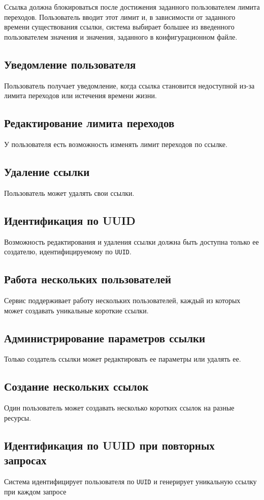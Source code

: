 \documentclass[a4paper, 14pt]{article}
\begin{document}
Ссылка должна блокироваться после достижения заданного пользователем лимита переходов. Пользователь вводит этот лимит и, в зависимости от заданного времени существования ссылки, система выбирает большее из введенного пользователем значения и значения, заданного в конфигурационном файле.

\subsection{Уведомление пользователя}

Пользователь получает уведомление, когда ссылка становится недоступной из-за лимита переходов или истечения времени жизни.

\subsection{Редактирование лимита переходов}

У пользователя есть возможность изменять лимит переходов по ссылке.

\subsection{Удаление ссылки}

Пользователь может удалять свои ссылки.

\subsection{Идентификация по UUID}

Возможность редактирования и удаления ссылки должна быть доступна только ее создателю, идентифицируемому по \texttt{UUID}.

\subsection{Работа нескольких пользователей}

Сервис поддерживает работу нескольких пользователей, каждый из которых может создавать уникальные короткие ссылки.

\subsection{Администрирование параметров ссылки}

Только создатель ссылки может редактировать ее параметры или удалять ее.

\subsection{Создание нескольких ссылок}

Один пользователь может создавать несколько коротких ссылок на разные ресурсы.

\subsection{Идентификация по UUID при повторных запросах}

Система идентифицирует пользователя по \texttt{UUID} и генерирует уникальную ссылку при каждом запросе
\end{document}
